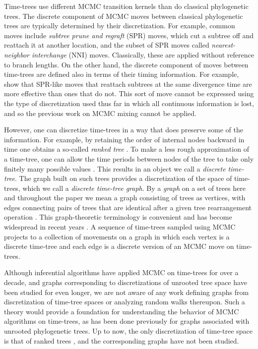 \documentclass[11pt]{amsart}
\theoremstyle{definition}
\newcommand{\nni}{\mathrm{NNI}}
\begin{document}
Time-trees use different MCMC transition kernels than do classical phylogenetic trees.
The discrete component of MCMC moves between classical phylogenetic trees are typically determined by their discretization.
For example, common moves include \emph{subtree prune and regraft} (SPR) moves, which cut a subtree off and reattach it at another location, and the subset of SPR moves called \emph{nearest-neighbor interchange} ($\nni$) moves.
Classically, these are applied without reference to branch lengths.
On the other hand, the discrete component of moves between time-trees are defined also in terms of their timing information.
For example, \textcite{Hohna2008-vl} show that SPR-like moves that reattach subtrees at the same divergence time are more effective than ones that do not.
This sort of move cannot be expressed using the type of discretization used thus far in which all continuous information is lost, and so the previous work on MCMC mixing cannot be applied.

However, one can discretize time-trees in a way that does preserve some of the information.
For example, by retaining the order of internal nodes backward in time one obtains a so-called \emph{ranked tree} \autocite{Semple2003-nj}.
To make a less rough approximation of a time-tree, one can allow the time periods between nodes of the tree to take only finitely many possible values \autocite{Akerborg2008-cl}.
This results in an object we call a \emph{discrete time-tree}.
The graph built on such trees provides a discretization of the space of time-trees, which we call a \emph{discrete time-tree graph}.
By a \emph{graph} on a set of trees here and throughout the paper we mean a graph consisting of trees as vertices, with edges connecting pairs of trees that are identical after a given tree rearrangement operation \autocite{Semple2003-nj}.
This graph-theoretic terminology is convenient and has become widespread in recent years \autocite{spade2014note, Whidden2015-yi, Gavryushkin2014-bw}.
A sequence of time-trees sampled using MCMC projects to a collection of movements on a graph in which each vertex is a discrete time-tree and each edge is a discrete version of an MCMC move on time-trees.

Although inferential algorithms have applied MCMC on time-trees for over a decade, and graphs corresponding to discretizations of unrooted tree space have been studied for even longer, we are not aware of any work defining graphs from discretization of time-tree spaces or analyzing random walks thereupon.
Such a theory would provide a foundation for understanding the behavior of MCMC algorithms on time-trees, as has been done previously for graphs associated with unrooted phylogenetic trees.
Up to now, the only discretization of time-tree space is that of ranked trees \autocite{Page1991-rd,Ford2009-qi,Lambert2013-mr}, and the corresponding graphs have not been studied.
\end{document}
